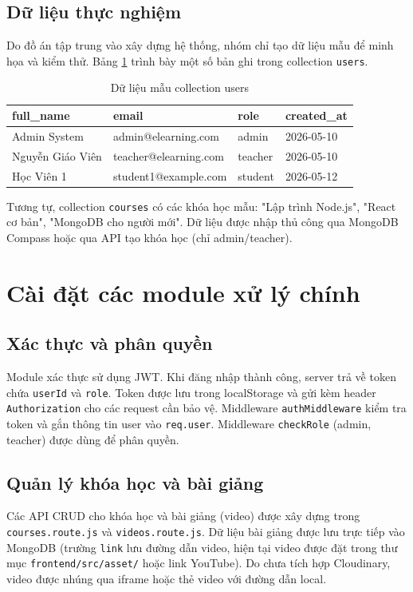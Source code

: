 \subsection{Dữ liệu thực nghiệm}
Do đồ án tập trung vào xây dựng hệ thống, nhóm chỉ tạo dữ liệu mẫu để minh họa và kiểm thử. Bảng \ref{tab:sample_users} trình bày một số bản ghi trong collection \texttt{users}.

\begin{table}[H]
\centering
\caption{Dữ liệu mẫu collection users}
\label{tab:sample_users}
\begin{tabular}{|l|l|l|l|}
\hline
\textbf{full\_name} & \textbf{email} & \textbf{role} & \textbf{created\_at} \\ \hline
Admin System & admin@elearning.com & admin & 2026-05-10 \\ \hline
Nguyễn Giáo Viên & teacher@elearning.com & teacher & 2026-05-10 \\ \hline
Học Viên 1 & student1@example.com & student & 2026-05-12 \\ \hline
\end{tabular}
\end{table}

Tương tự, collection \texttt{courses} có các khóa học mẫu: "Lập trình Node.js", "React cơ bản", "MongoDB cho người mới". Dữ liệu được nhập thủ công qua MongoDB Compass hoặc qua API tạo khóa học (chỉ admin/teacher).

\section{Cài đặt các module xử lý chính}

\subsection{Xác thực và phân quyền}
Module xác thực sử dụng JWT. Khi đăng nhập thành công, server trả về token chứa \texttt{userId} và \texttt{role}. Token được lưu trong localStorage và gửi kèm header \texttt{Authorization} cho các request cần bảo vệ. Middleware \texttt{authMiddleware} kiểm tra token và gắn thông tin user vào \texttt{req.user}. Middleware \texttt{checkRole} (admin, teacher) được dùng để phân quyền.

\subsection{Quản lý khóa học và bài giảng}
Các API CRUD cho khóa học và bài giảng (video) được xây dựng trong \texttt{courses.route.js} và \texttt{videos.route.js}. Dữ liệu bài giảng được lưu trực tiếp vào MongoDB (trường \texttt{link} lưu đường dẫn video, hiện tại video được đặt trong thư mục \texttt{frontend/src/asset/} hoặc link YouTube). Do chưa tích hợp Cloudinary, video được nhúng qua iframe hoặc thẻ video với đường dẫn local.

